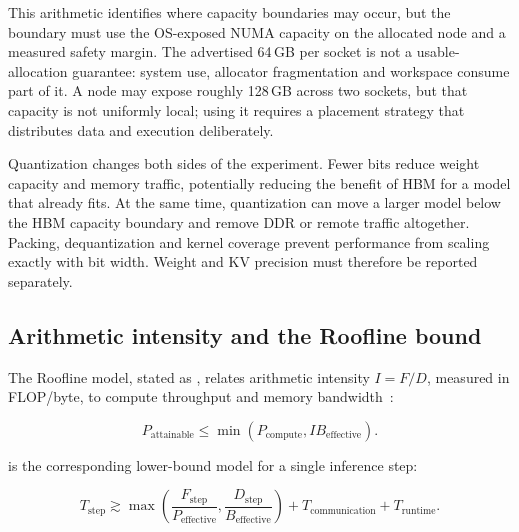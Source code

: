 This arithmetic identifies where capacity boundaries may occur, but the
boundary must use the OS-exposed NUMA capacity on the allocated node and
a measured safety margin.  The advertised 64\,GB per socket is not a
usable-allocation guarantee: system use, allocator fragmentation and
workspace consume part of it.  A node may expose roughly 128\,GB across
two sockets, but that capacity is not uniformly local; using it requires
a placement strategy that distributes data and execution deliberately.

Quantization changes both sides of the experiment.  Fewer bits reduce
weight capacity and memory traffic, potentially reducing the benefit of
HBM for a model that already fits.  At the same time, quantization can
move a larger model below the HBM capacity boundary and remove DDR or
remote traffic altogether.  Packing, dequantization and kernel coverage
prevent performance from scaling exactly with bit width.  Weight and KV
precision must therefore be reported separately.

\subsection{Arithmetic intensity and the Roofline bound}
\label{sec:roofline}

The Roofline model, stated as , relates arithmetic
intensity \(I=F/D\), measured in FLOP/byte, to compute throughput and
memory bandwidth~\cite{williams2009roofline}:

\begin{equation}
\label{eq:roofline}
  P_{\mathrm{attainable}}
  \leq
  \min\!\left(P_{\mathrm{compute}},
              I B_{\mathrm{effective}}\right).
\end{equation}

 is the corresponding lower-bound model for a single
inference step:

\begin{equation}
\label{eq:step}
  T_{\mathrm{step}}
  \gtrsim
  \max\!\left(
      \frac{F_{\mathrm{step}}}{P_{\mathrm{effective}}},
      \frac{D_{\mathrm{step}}}{B_{\mathrm{effective}}}
  \right)
  + T_{\mathrm{communication}} + T_{\mathrm{runtime}}.
\end{equation}

